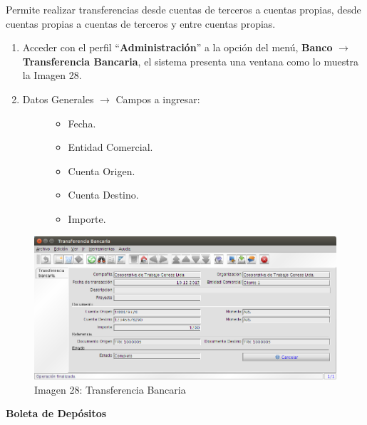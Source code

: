 \documentclass[letterpaper,10pt,spanish]{sphinxmanual}
\begin{document}
Permite realizar transferencias desde cuentas de terceros a cuentas propias, desde cuentas propias a cuentas de terceros y entre cuentas propias.
\begin{enumerate}
\item {} 
Acceder con el perfil ``\textbf{Administración}'' a la opción del menú, \textbf{Banco} \(\rightarrow\)  \textbf{Transferencia Bancaria}, el sistema presenta una ventana como lo muestra la Imagen 28.

\item {} \begin{description}
\item[{Datos Generales \(\rightarrow\) Campos a ingresar:}] \leavevmode\begin{itemize}
\item {} 
Fecha.

\item {} 
Entidad Comercial.

\item {} 
Cuenta Origen.

\item {} 
Cuenta Destino.

\item {} 
Importe.

\end{itemize}

\end{description}

\end{enumerate}
\begin{figure}[htbp]
\centering
\capstart

\includegraphics{ly_bancos_28.png}
\caption{Imagen 28: Transferencia Bancaria}\end{figure}

\textbf{Boleta de Depósitos}
\end{document}
